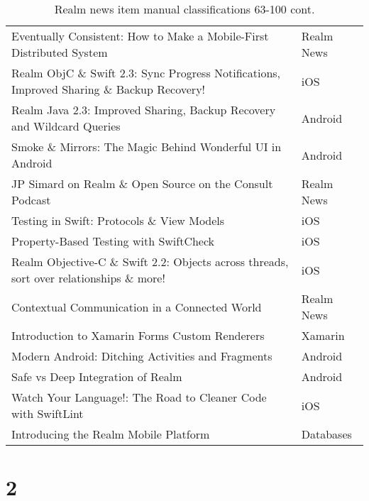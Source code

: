 \documentclass[letterpaper,11pt]{article}
\begin{document}
\begin{table}[h]
\begin{adjustbox}{max width=\linewidth}
\begin{tabular}{ | l | l |}
Eventually Consistent: How to Make a Mobile-First Distributed System & Realm News \\ 
Realm ObjC \& Swift 2.3: Sync Progress Notifications, Improved Sharing \& Backup Recovery! & iOS \\ 
Realm Java 2.3: Improved Sharing, Backup Recovery and Wildcard Queries & Android \\ 
Smoke \& Mirrors: The Magic Behind Wonderful UI in Android & Android \\ 
JP Simard on Realm \& Open Source on the Consult Podcast & Realm News \\ 
Testing in Swift: Protocols \& View Models & iOS \\ 
Property-Based Testing with SwiftCheck & iOS \\ 
Realm Objective-C \& Swift 2.2: Objects across threads, sort over relationships \& more! & iOS  \\ 
Contextual Communication in a Connected World & Realm News \\ 
Introduction to Xamarin Forms Custom Renderers & Xamarin \\ 
Modern Android: Ditching Activities and Fragments & Android  \\ 
Safe vs Deep Integration of Realm & Android \\ 
Watch Your Language!: The Road to Cleaner Code with SwiftLint & iOS \\ 
Introducing the Realm Mobile Platform & Databases \\ 
\hline
\end{tabular}
\end{adjustbox}
\caption{Realm news item manual classifications 63-100 cont.}
\label{table:q1mclass}
\end{table}

\clearpage




\clearpage


\section*{2}
\end{document}
